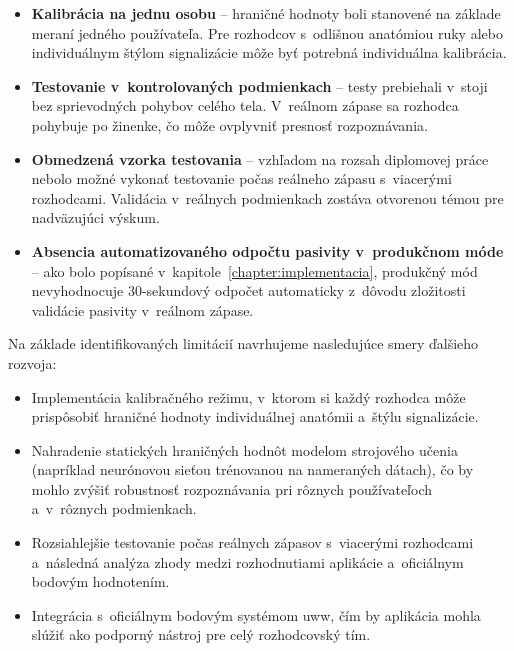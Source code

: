 \begin{itemize}
  \item \textbf{Kalibrácia na jednu osobu} -- hraničné
        hodnoty boli stanovené na základe meraní
        jedného používateľa. Pre rozhodcov s~odlišnou
        anatómiou ruky alebo individuálnym štýlom
        signalizácie môže byť potrebná individuálna
        kalibrácia.

  \item \textbf{Testovanie v~kontrolovaných podmienkach} --
        testy prebiehali v~stoji bez sprievodných
        pohybov celého tela. V~reálnom zápase sa
        rozhodca pohybuje po žinenke, čo môže ovplyvniť
        presnosť rozpoznávania.

  \item \textbf{Obmedzená vzorka testovania} -- vzhľadom
        na rozsah diplomovej práce nebolo možné vykonať
        testovanie počas reálneho zápasu s~viacerými
        rozhodcami. Validácia v~reálnych podmienkach
        zostáva otvorenou témou pre nadväzujúci výskum.

  \item \textbf{Absencia automatizovaného odpočtu pasivity
          v~produkčnom móde} -- ako bolo popísané
        v~kapitole~\ref{chapter:implementacia}, %
        produkčný mód nevyhodnocuje 30-sekundový
        odpočet automaticky z~dôvodu zložitosti
        validácie pasivity v~reálnom zápase.
\end{itemize}

Na základe identifikovaných limitácií navrhujeme
nasledujúce smery ďalšieho rozvoja:

\begin{itemize}
  \item Implementácia kalibračného režimu, v~ktorom
        si každý rozhodca môže prispôsobiť hraničné
        hodnoty individuálnej anatómii a~štýlu
        signalizácie.

  \item Nahradenie statických hraničných hodnôt
        modelom strojového učenia (napríklad neurónovou
        sieťou trénovanou na nameraných dátach), čo by
        mohlo zvýšiť robustnosť rozpoznávania pri rôznych
        používateľoch a~v~rôznych podmienkach.

  \item Rozsiahlejšie testovanie počas reálnych zápasov
        s~viacerými rozhodcami a~následná analýza
        zhody medzi rozhodnutiami aplikácie a~oficiálnym
        bodovým hodnotením.

  \item Integrácia s~oficiálnym bodovým systémom
        \Gls{uww}, čím by aplikácia mohla slúžiť
        ako podporný nástroj pre celý rozhodcovský tím.
\end{itemize}